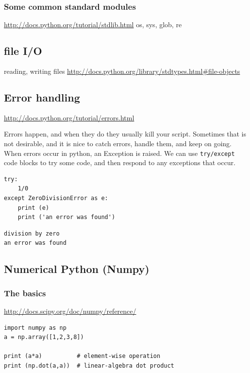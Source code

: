 \documentclass[11pt]{article}
\begin{document}
\subsubsection{Some common standard modules}
\label{sec:org7319150}
\url{http://docs.python.org/tutorial/stdlib.html}
os, sys, glob,  re


\subsection{file I/O}
\label{sec:org05408c2}
reading, writing files
\url{http://docs.python.org/library/stdtypes.html\#file-objects}


\subsection{Error handling}
\label{sec:org17cbe52}
\url{http://docs.python.org/tutorial/errors.html}

Errors happen, and when they do they usually kill your script. Sometimes that is not desirable, and it is nice to catch errors, handle them, and keep on going. When errors occur in python, an Exception is raised. We can use \texttt{try/except} code blocks to try some code, and then respond to any exceptions that occur.

\begin{verbatim}
try:
    1/0
except ZeroDivisionError as e:
    print (e)
    print ('an error was found')
\end{verbatim}

\begin{verbatim}
division by zero
an error was found
\end{verbatim}


\subsection{Numerical Python (Numpy)}
\label{sec:orgc32d1ac}

\subsubsection{The basics}
\label{sec:orgaaab64b}
\url{http://docs.scipy.org/doc/numpy/reference/}

\begin{verbatim}
import numpy as np
a = np.array([1,2,3,8])

print (a*a)          # element-wise operation
print (np.dot(a,a))  # linear-algebra dot product
\end{verbatim}
\end{document}
